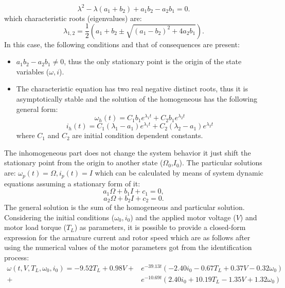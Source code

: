 \documentclass[12pt,english]{article}
\begin{document}
\begin{equation}
\lambda^2-\lambda (a_1+b_2)+a_1 b_2 - a_2 b_1=0.
\end{equation}
which characteristic roots (eigenvalues) are:
\begin{equation}
\lambda_{1,2}=\frac{1}{2} \left({a_1}+{b_2} \pm \sqrt{({a_1}-{b_2})^2+4 {a_2} {b_1}}\right).
\end{equation}
In this case, the following conditions and that of consequences are present:
\begin{itemize}
	\item $a_1 b_2 - a_2 b_1 \neq 0$, thus the only stationary point is the origin of the state variables ($\omega,i$).
	\item The characteristic equation has two real negative distinct roots, thus it is asymptotically stable and the solution of the homogeneous has the following general form: \cite{eqworld}
	\begin{equation}
		\omega_h(t) = C_1 b_1 e^{\lambda_1 t} + C_2 b_1 e^{\lambda_2 t}
	\end{equation}
	\begin{equation}
		i_h(t) = C_1 (\lambda_1-a_1) e^{\lambda_1 t} + C_2 (\lambda_2-a_1) e^{\lambda_2 t}
	\end{equation}
	where $C_1$ and $C_2$ are initial condition dependent constants.
\end{itemize}
The inhomogeneous part does not change the system behavior it just shift the stationary point from the origin to another state ($\Omega_0$,$I_0$). The particular solutions are:
	$\omega_p(t) = \Omega,
	i_p(t) = I$
which can be calculated by means of system dynamic equations assuming a stationary form of it:
\begin{equation}
	a_1 \Omega + b_1 I + c_1 =0,
\end{equation}
\begin{equation}
	a_2 \Omega + b_2 I + c_2 =0.
\end{equation}
The general solution is the sum of the homogeneous and particular solution. Considering the initial conditions ($\omega_0,i_0$) and the applied motor voltage ($V$) and motor load torque ($T_L$) as parameters, it is possible to provide a closed-form expression for the armature current and rotor speed which are as follows after using the numerical values of the motor parameters got from the identification process:
\begin{equation}
\begin{split}
	\omega(t,V,T_L,\omega_0,i_0) = -9.52 T_L + 0.98 V + 
	&e^{-39.13 t} (-2.40 i_0 - 0.67 T_L + 0.37 V - 0.32 \omega_0) \\
	+&e^{-10.69 t} (2.40 i_0 + 10.19 T_L - 1.35 V + 
	1.32 \omega_0)
\end{split}
\end{equation}
\end{document}
